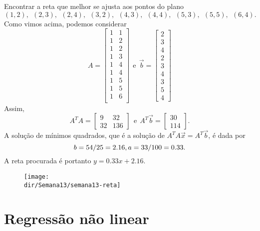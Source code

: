 \documentclass[../livro.tex]{subfiles}  %
\providecommand{\dir}{..}
\begin{document}
\begin{example}
  Encontrar a reta que melhor se ajusta aos pontos do plano
  \[
  (1,2), \ \ (2,3), \ \ (2,4), \ \ (3,2), \ \ (4,3), \ \ (4,4), \ \ (5,3), \ \ (5,5), \ \ (6,4).
  \] Como vimos acima, podemos considerar
  \[
  A =
  \begin{bmatrix}
    1 & 1 \\
    1 & 2 \\
    1 & 2 \\
    1 & 3 \\
    1 & 4 \\
    1 & 4 \\
    1 & 5 \\
    1 & 5 \\
    1 & 6 \\
  \end{bmatrix} \ \ \text{e} \ \
  \vec{b} =
  \begin{bmatrix}
    2\\3\\4\\2\\3\\4\\3\\5\\4
  \end{bmatrix}
  \] Assim,
  \[
  A^T A =
  \begin{bmatrix}
    9  & 32  \\
    32  & 136
  \end{bmatrix}  \ \ \text{e} \ \
  A^T \vec{b} =
  \begin{bmatrix}
    30\\114
  \end{bmatrix}.
  \] A solução de mínimos quadrados, que é a solução de $A^T A \vec{x} = A^T\vec{b}$, é dada por
  \[
  b = 54/25 = 2.16, \\ a = 33/100 = 0.33.
  \] A reta procurada é portanto $y = 0.33 x + 2.16$.
  \begin{figure}[h!]
    \begin{center}
      \texttt{[image: \\dir/Semana13/semana13-reta]}
    \end{center}
  \end{figure}
\end{example}


\section{Regressão não linear}
\end{document}
